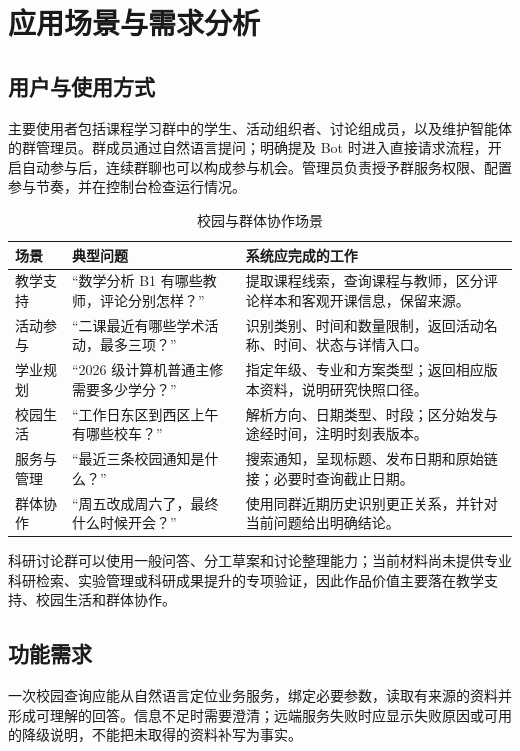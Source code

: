 \section{应用场景与需求分析}
\subsection{用户与使用方式}
主要使用者包括课程学习群中的学生、活动组织者、讨论组成员，以及维护智能体的群管理员。群成员通过自然语言提问；明确提及 Bot 时进入直接请求流程，开启自动参与后，连续群聊也可以构成参与机会。管理员负责授予群服务权限、配置参与节奏，并在控制台检查运行情况。

\begin{table}[htbp]\centering
\caption{校园与群体协作场景}
\begin{tabularx}{\textwidth}{@{}L{22mm}Y Y@{}}\toprule
场景 & 典型问题 & 系统应完成的工作\\\midrule
教学支持 & “数学分析 B1 有哪些教师，评论分别怎样？” & 提取课程线索，查询课程与教师，区分评论样本和客观开课信息，保留来源。\\
活动参与 & “二课最近有哪些学术活动，最多三项？” & 识别类别、时间和数量限制，返回活动名称、时间、状态与详情入口。\\
学业规划 & “2026 级计算机普通主修需要多少学分？” & 指定年级、专业和方案类型；返回相应版本资料，说明研究快照口径。\\
校园生活 & “工作日东区到西区上午有哪些校车？” & 解析方向、日期类型、时段；区分始发与途经时间，注明时刻表版本。\\
服务与管理 & “最近三条校园通知是什么？” & 搜索通知，呈现标题、发布日期和原始链接；必要时查询截止日期。\\
群体协作 & “周五改成周六了，最终什么时候开会？” & 使用同群近期历史识别更正关系，并针对当前问题给出明确结论。\\\bottomrule
\end{tabularx}
\end{table}

科研讨论群可以使用一般问答、分工草案和讨论整理能力；当前材料尚未提供专业科研检索、实验管理或科研成果提升的专项验证，因此作品价值主要落在教学支持、校园生活和群体协作。

\subsection{功能需求}
一次校园查询应能从自然语言定位业务服务，绑定必要参数，读取有来源的资料并形成可理解的回答。信息不足时需要澄清；远端服务失败时应显示失败原因或可用的降级说明，不能把未取得的资料补写为事实。


